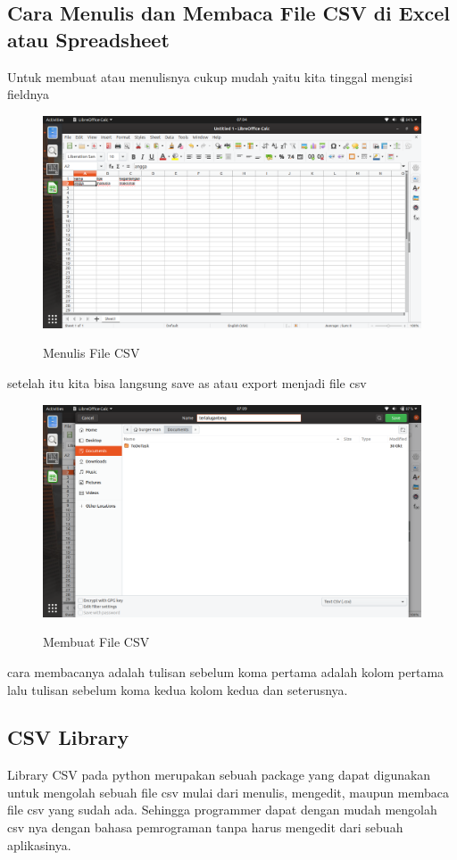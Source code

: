 \subsection{Cara Menulis dan Membaca File CSV di Excel atau Spreadsheet}
Untuk membuat atau menulisnya cukup mudah yaitu kita tinggal mengisi fieldnya
\begin{figure}[H]
\centering
\caption{Menulis File CSV}
\includegraphics[width=1\textwidth]{figures/wek1.png}
\label{tuliscsv}
\end{figure}
setelah itu kita bisa langsung save as atau export menjadi file csv
\begin{figure}[H]
\centering
\caption{Membuat File CSV}
\includegraphics[width=1\textwidth]{figures/wek2.png}
\label{buatcsv}
\end{figure}
cara membacanya adalah tulisan sebelum koma pertama adalah kolom pertama lalu tulisan sebelum koma kedua kolom kedua dan seterusnya.

\subsection{CSV Library}
Library CSV pada python merupakan sebuah package yang dapat digunakan untuk mengolah sebuah file csv mulai dari menulis, mengedit, maupun membaca file csv yang sudah ada. Sehingga programmer dapat dengan mudah mengolah csv nya dengan bahasa pemrograman tanpa harus mengedit dari sebuah aplikasinya.

